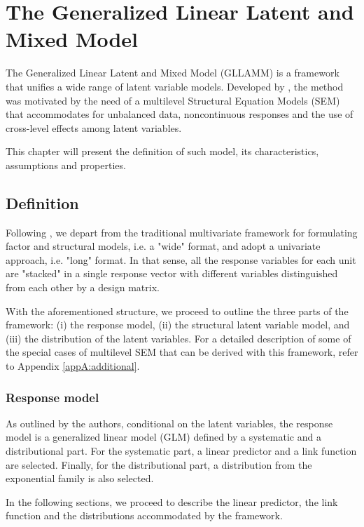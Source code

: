 \chapter{The Generalized Linear Latent and Mixed Model} \label{chap:framework}

The Generalized Linear Latent and Mixed Model (GLLAMM) is a framework that unifies a wide range of latent variable models. Developed by \citet{Rabe_et_al_2004a, Rabe_et_al_2004c Skrondal_et_al_2004}, the method was motivated by the need of a multilevel Structural Equation Models (SEM) that accommodates for unbalanced data, noncontinuous responses and the use of cross-level effects among latent variables. 

This chapter will present the definition of such model, its characteristics, assumptions and properties.


\section{Definition}
Following \citet{Rabe_et_al_2004a, Rabe_et_al_2012}, we depart from the traditional multivariate framework for formulating factor and structural models, i.e. a "wide" format, and adopt a univariate approach, i.e. "long" format. In that sense, all the response variables for each unit are "stacked" in a single response vector with different variables distinguished from each other by a design matrix.

With the aforementioned structure, we proceed to outline the three parts of the framework: (i) the response model, (ii) the structural latent variable model, and (iii) the distribution of the latent variables. For a detailed description of some of the special cases of multilevel SEM that can be derived with this framework, refer to Appendix \ref{appA:additional}.


\subsection{Response model}
As outlined by the authors, conditional on the latent variables, the response model is a generalized linear model (GLM) defined by a systematic and a distributional part. For the systematic part, a linear predictor and a link function are selected. Finally, for the distributional part, a distribution from the exponential family is also selected. 

In the following sections, we proceed to describe the linear predictor, the link function and the distributions accommodated by the framework.


